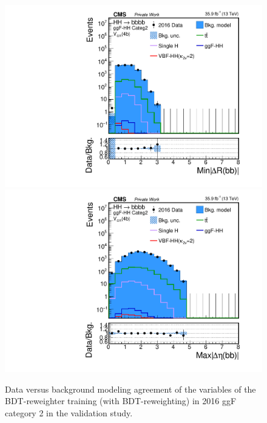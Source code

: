 \begin{figure}[htbp!]
\begin{center}
\includegraphics[width=0.24\linewidth]{Figures/Modeling/background/plotsDatadrivenWithBDT/2016/GGFcateg2_CR_210/Histogram/plot2016_min_4b_deltaR_Btag4_GGFcateg2_CR_210_Histogram_log.pdf}
\includegraphics[width=0.24\linewidth]{Figures/Modeling/background/plotsDatadrivenWithBDT/2016/GGFcateg2_CR_210/Histogram/plot2016_max_4b_deltaEta_Btag4_GGFcateg2_CR_210_Histogram_log.pdf}
\end{center}
\caption{Data versus background modeling agreement of the variables of the BDT-reweighter training (with  BDT-reweighting) in 2016 ggF category 2 in the validation study.}
\label{bkg:fig:valbdtregvarggf2_2016}
\end{figure}

